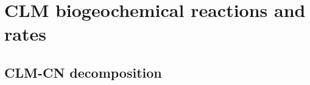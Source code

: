 \documentclass[gmd, manuscript]{copernicus}
\begin{document}
%
%
%
%
%
%
%
%
%
%
%
%
%
%
%
%
%
%
%
%
%

%

\appendix

\section{CLM biogeochemical reactions and rates}
\label{sec:clmbgc}
\subsection{CLM-CN decomposition}
\label{section:bgc}
\end{document}
